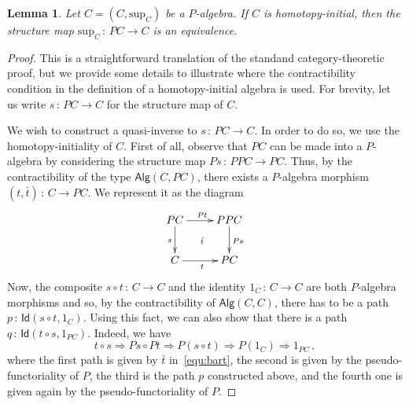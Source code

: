 \documentclass[10pt,a4paper,oneside,reqno]{amsart}
\newcommand{\xycenter}[1]{\vcenter{\hbox{\xymatrix{#1}}}}
\numberwithin{equation}{section}
\theoremstyle{mythm}
\newtheorem{lemma}[theorem]{Lemma}
\theoremstyle{mydef}
\theoremstyle{myrmk}
\newcommand{\co}{\,{:}\,}
\newcommand{\Id}{\mathsf{Id}}
\newcommand{\Palg}{\mathsf{Alg}}
\renewcommand{\sup}{\mathrm{sup}}
\begin{document}
\begin{lemma}\label{lem:IntLambek} Let $C = (C, \sup_C)$ be a $P$-algebra. 
If $C$ is homotopy-initial, then the structure map $\sup_C \co PC \to C$ is an equivalence.
\end{lemma}


\begin{proof} This is a straightforward translation of the standand category-theoretic proof, but we provide
some details to illustrate where the contractibility condition in the definition of a homotopy-initial algebra is
used. For brevity, let us write $s \co PC \to C$ for the structure map of $C$. 

 We wish to construct a quasi-inverse to $s \co PC \to C$. In order to do so, we use the homotopy-initiality
of $C$. First of all, observe that $PC$ can be made into a $P$-algebra by considering the structure map 
$Ps \co PPC \to PC$. Thus, by the contractibility of the type $\Palg(C, PC)$, there exists a $P$-algebra
morphism $(t, \bar{t}) \co C \to PC$. We represent it as the diagram
\begin{equation}
\label{equ:bart}
\xycenter{
PC \ar[d]_{s} \ar[r]^{Pt} \ar@{}[dr]|{\bar{t}}& PPC \ar[d]^{Ps} \\
C \ar[r]_{t} & PC}
\end{equation}
Now, the composite $s \circ t \co C \to C$ and the identity $1_C \co C \to C$ are both $P$-algebra
morphisms and so, by the contractibility of $\Palg(C,C)$, there has to be a path $p \co \Id(s\circ t ,1_C)$. 
Using this fact, we can also show that there is a path $q \co \Id(t \circ s, 1_{PC})$. Indeed, we have
\[
t \circ s  \Rightarrow Ps \circ Pt 
 \Rightarrow P(s \circ t) 
 \Rightarrow P(1_C) 
  \Rightarrow 1_{PC} \, ,
\]
where the first path is given by $\bar{t}$ in~\eqref{equ:bart}, the second is given by the pseudo-functoriality of $P$,
the third is the path $p$ constructed above, and the fourth one is given again by the pseudo-functoriality of $P$. 
\end{proof}
\end{document}
